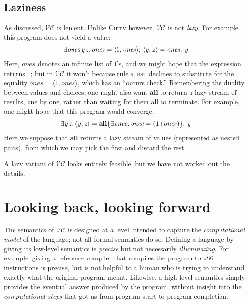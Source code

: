 \documentclass[acmsmall,review,dvipsnames]{acmart}
\newcommand{\Varid}[1]{\mathit{#1}}
\newcommand{\versecalc}{$\mathcal{VC}$}
\newcommand{\rulename}[1]{\textsc{\small #1}}
\begin{document}
\subsection{Laziness} \label{sec:laziness}

As  discussed, \versecalc{} is lenient. Unlike Curry however, \versecalc{} is not \emph{lazy}.
For example this
program does not yield a value:
$$
\ensuremath{\exists\Varid{ones}\hspace{0.3mm}\Varid{y}\hspace{0.3mm}\Varid{z}.\,\Varid{ones}\mathrel{=}\langle{}\mathrm{1},\Varid{ones}\rangle;\,\langle{}\Varid{y},\Varid{z}\rangle\mathrel{=}\Varid{ones};\,\Varid{y}}
$$
Here, \ensuremath{\Varid{ones}} denotes an infinite list of \ensuremath{\mathrm{1}}'s, and we might hope that the expression returns
\ensuremath{\mathrm{1}}; but in \versecalc{} it won't because rule \rulename{subst} declines to substitute for the equality
\ensuremath{\Varid{ones}\mathrel{=}\langle{}\mathrm{1},\Varid{ones}\rangle}, which has an ``occurs check.''
Remembering the duality between values and choices,
one might also want \ensuremath{\textbf{all}} to return a lazy stream
of results, one by one, rather than waiting for them all to terminate.  For example, one might hope that
this program would converge:
$$
\ensuremath{\exists\Varid{y}\hspace{0.3mm}\Varid{z}.\,\langle{}\Varid{y},\Varid{z}\rangle\mathrel{=}\textbf{all}\{\exists\Varid{onec}.\,\Varid{onec}\mathrel{=}(\mathrm{1}\;\rule[-0.3mm]{0.5mm}{2.5mm}\;\Varid{onec})\};\,\Varid{y}}
$$
Here we suppose that \ensuremath{\textbf{all}} returns a lazy stream of values (represented as nested
pairs), from which we may pick the first and discard the rest.

A lazy variant of \versecalc{} looks entirely feasible, but we have not worked out the details.

\section{Looking back, looking forward}

The semantics of \versecalc{} is designed at a level intended to capture the
\emph{computational model} of the language; not all formal semantics do so.
Defining a language by giving its low-level semantics is \emph{precise} but not necessarily \emph{illuminating}.
For example, giving a reference compiler that compiles
the program to x86 instructions is precise, but is not helpful
to a human who is trying to understand exactly what the original program
meant. Likewise, a high-level semantics simply provides the eventual answer
produced by the program, without insight into the \emph{computational steps}
that got us from program start to program completion.
\end{document}
